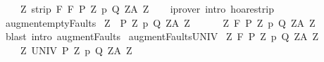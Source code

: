 \begin{isabellebody}
\ \ \ \ {\isasymforall}Z{\isachardot}\ strip\ F{\isacharprime}\ {\isasymGamma}{\isacharcomma}{\isacharbraceleft}{\isacharbraceright}{\isasymturnstile}\isactrlbsub {\isacharslash}F\isactrlesub \ {\isacharparenleft}P\ Z{\isacharparenright}\ p\ {\isacharparenleft}Q\ Z{\isacharparenright}{\isacharcomma}{\isacharparenleft}A\ Z{\isacharparenright}{\isachardoublequoteclose}\isanewline
%
\isadelimproof
\ \ %
\endisadelimproof
%
\isatagproof
{}\isamarkupfalse%
\ {\isacharparenleft}iprover\ intro{\isacharcolon}\ hoare{\isacharunderscore}strip{\isacharunderscore}{\isasymGamma}{\isacharparenright}%
\endisatagproof
{\isafoldproof}%
%
\isadelimproof
\isanewline
%
\endisadelimproof
\isanewline
{}\isamarkupfalse%
\ augment{\isacharunderscore}emptyFaults{\isacharcolon}\isanewline
\ {\isachardoublequoteopen}{\isasymlbrakk}{\isasymforall}Z{\isachardot}\ {\isasymGamma}{\isacharcomma}{\isacharbraceleft}{\isacharbraceright}{\isasymturnstile}\isactrlbsub {\isacharslash}{\isacharbraceleft}{\isacharbraceright}\isactrlesub \ {\isacharparenleft}P\ Z{\isacharparenright}\ p\ {\isacharparenleft}Q\ Z{\isacharparenright}{\isacharcomma}{\isacharparenleft}A\ Z{\isacharparenright}{\isasymrbrakk}\ {\isasymLongrightarrow}\ \isanewline
\ \ \ \ {\isasymforall}Z{\isachardot}\ {\isasymGamma}{\isacharcomma}{\isacharbraceleft}{\isacharbraceright}{\isasymturnstile}\isactrlbsub {\isacharslash}F\isactrlesub \ {\isacharparenleft}P\ Z{\isacharparenright}\ p\ {\isacharparenleft}Q\ Z{\isacharparenright}{\isacharcomma}{\isacharparenleft}A\ Z{\isacharparenright}{\isachardoublequoteclose}\isanewline
%
\isadelimproof
\ \ %
\endisadelimproof
%
\isatagproof
{}\isamarkupfalse%
\ {\isacharparenleft}blast\ intro{\isacharcolon}\ augment{\isacharunderscore}Faults{\isacharparenright}%
\endisatagproof
{\isafoldproof}%
%
\isadelimproof
\isanewline
%
\endisadelimproof
\isanewline
{}\isamarkupfalse%
\ augment{\isacharunderscore}FaultsUNIV{\isacharcolon}\isanewline
\ {\isachardoublequoteopen}{\isasymlbrakk}{\isasymforall}Z{\isachardot}\ {\isasymGamma}{\isacharcomma}{\isacharbraceleft}{\isacharbraceright}{\isasymturnstile}\isactrlbsub {\isacharslash}F\isactrlesub \ {\isacharparenleft}P\ Z{\isacharparenright}\ p\ {\isacharparenleft}Q\ Z{\isacharparenright}{\isacharcomma}{\isacharparenleft}A\ Z{\isacharparenright}{\isasymrbrakk}\ {\isasymLongrightarrow}\ \isanewline
\ \ \ \ {\isasymforall}Z{\isachardot}\ {\isasymGamma}{\isacharcomma}{\isacharbraceleft}{\isacharbraceright}{\isasymturnstile}\isactrlbsub {\isacharslash}UNIV\isactrlesub \ {\isacharparenleft}P\ Z{\isacharparenright}\ p\ {\isacharparenleft}Q\ Z{\isacharparenright}{\isacharcomma}{\isacharparenleft}A\ Z{\isacharparenright}{\isachardoublequoteclose}\isanewline

\end{isabellebody}

